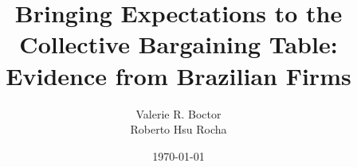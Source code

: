 \documentclass[12pt]{article}
\begin{document}
	\title{Bringing Expectations to the Collective Bargaining Table: Evidence from Brazilian Firms}
	\author{Valerie R. Boctor \\ Roberto Hsu Rocha}
	\date{\today}
	\maketitle
	\abstract{}
\end{document}
